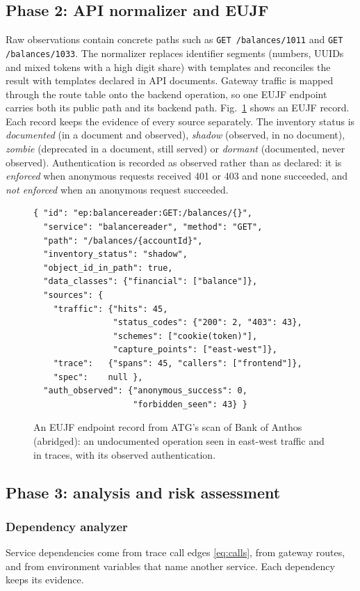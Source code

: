 \documentclass[conference]{IEEEtran}
\begin{document}
\subsection{Phase 2: API normalizer and EUJF}
Raw observations contain concrete paths such as \texttt{GET /balances/1011} and \texttt{GET /balances/1033}. The normalizer replaces identifier segments (numbers, UUIDs and mixed tokens with a high digit share) with templates and reconciles the result with templates declared in API documents. Gateway traffic is mapped through the route table onto the backend operation, so one EUJF endpoint carries both its public path and its backend path. Fig.~\ref{fig:eujf} shows an EUJF record. Each record keeps the evidence of every source separately. The inventory status is \emph{documented} (in a document and observed), \emph{shadow} (observed, in no document), \emph{zombie} (deprecated in a document, still served) or \emph{dormant} (documented, never observed). Authentication is recorded as observed rather than as declared: it is \emph{enforced} when anonymous requests received 401 or 403 and none succeeded, and \emph{not enforced} when an anonymous request succeeded.

\begin{figure}[t]
\centering
\scriptsize
\begin{verbatim}
{ "id": "ep:balancereader:GET:/balances/{}",
  "service": "balancereader", "method": "GET",
  "path": "/balances/{accountId}",
  "inventory_status": "shadow",
  "object_id_in_path": true,
  "data_classes": {"financial": ["balance"]},
  "sources": {
    "traffic": {"hits": 45,
                "status_codes": {"200": 2, "403": 43},
                "schemes": ["cookie(token)"],
                "capture_points": ["east-west"]},
    "trace":   {"spans": 45, "callers": ["frontend"]},
    "spec":    null },
  "auth_observed": {"anonymous_success": 0,
                    "forbidden_seen": 43} }
\end{verbatim}
\caption{An EUJF endpoint record from ATG's scan of Bank of Anthos (abridged): an undocumented operation seen in east-west traffic and in traces, with its observed authentication.}
\label{fig:eujf}
\end{figure}

\subsection{Phase 3: analysis and risk assessment}
\subsubsection{Dependency analyzer}
Service dependencies come from trace call edges \eqref{eq:calls}, from gateway routes, and from environment variables that name another service. Each dependency keeps its evidence.
\end{document}
